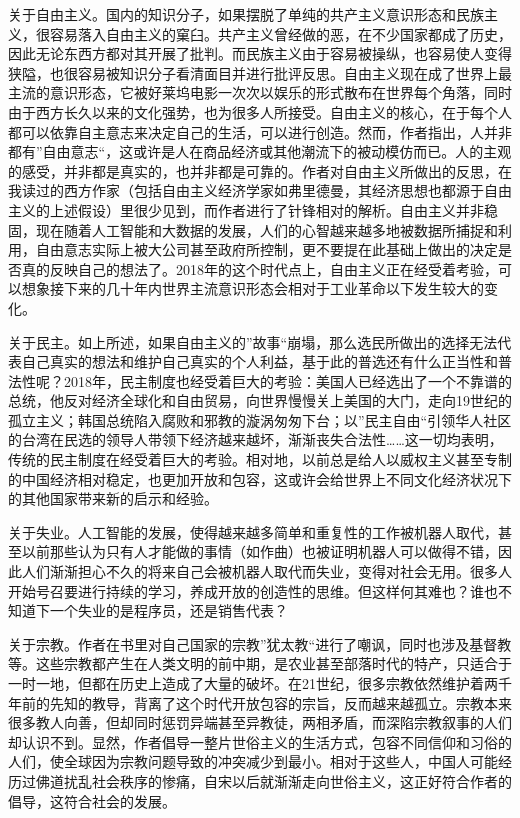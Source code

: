关于自由主义。国内的知识分子，如果摆脱了单纯的共产主义意识形态和民族主义，很容易落入自由主义的窠臼。共产主义曾经做的恶，在不少国家都成了历史，因此无论东西方都对其开展了批判。而民族主义由于容易被操纵，也容易使人变得狭隘，也很容易被知识分子看清面目并进行批评反思。自由主义现在成了世界上最主流的意识形态，它被好莱坞电影一次次以娱乐的形式散布在世界每个角落，同时由于西方长久以来的文化强势，也为很多人所接受。自由主义的核心，在于每个人都可以依靠自主意志来决定自己的生活，可以进行创造。然而，作者指出，人并非都有”自由意志“，这或许是人在商品经济或其他潮流下的被动模仿而已。人的主观的感受，并非都是真实的，也并非都是可靠的。作者对自由主义所做出的反思，在我读过的西方作家（包括自由主义经济学家如弗里德曼，其经济思想也都源于自由主义的上述假设）里很少见到，而作者进行了针锋相对的解析。自由主义并非稳固，现在随着人工智能和大数据的发展，人们的心智越来越多地被数据所捕捉和利用，自由意志实际上被大公司甚至政府所控制，更不要提在此基础上做出的决定是否真的反映自己的想法了。2018年的这个时代点上，自由主义正在经受着考验，可以想象接下来的几十年内世界主流意识形态会相对于工业革命以下发生较大的变化。

关于民主。如上所述，如果自由主义的”故事“崩塌，那么选民所做出的选择无法代表自己真实的想法和维护自己真实的个人利益，基于此的普选还有什么正当性和普法性呢？2018年，民主制度也经受着巨大的考验：美国人已经选出了一个不靠谱的总统，他反对经济全球化和自由贸易，向世界慢慢关上美国的大门，走向19世纪的孤立主义；韩国总统陷入腐败和邪教的漩涡匆匆下台；以”民主自由“引领华人社区的台湾在民选的领导人带领下经济越来越坏，渐渐丧失合法性……这一切均表明，传统的民主制度在经受着巨大的考验。相对地，以前总是给人以威权主义甚至专制的中国经济相对稳定，也更加开放和包容，这或许会给世界上不同文化经济状况下的其他国家带来新的启示和经验。

关于失业。人工智能的发展，使得越来越多简单和重复性的工作被机器人取代，甚至以前那些认为只有人才能做的事情（如作曲）也被证明机器人可以做得不错，因此人们渐渐担心不久的将来自己会被机器人取代而失业，变得对社会无用。很多人开始号召要进行持续的学习，养成开放的创造性的思维。但这样何其难也？谁也不知道下一个失业的是程序员，还是销售代表？

关于宗教。作者在书里对自己国家的宗教”犹太教“进行了嘲讽，同时也涉及基督教等。这些宗教都产生在人类文明的前中期，是农业甚至部落时代的特产，只适合于一时一地，但都在历史上造成了大量的破坏。在21世纪，很多宗教依然维护着两千年前的先知的教导，背离了这个时代开放包容的宗旨，反而越来越孤立。宗教本来很多教人向善，但却同时惩罚异端甚至异教徒，两相矛盾，而深陷宗教叙事的人们却认识不到。显然，作者倡导一整片世俗主义的生活方式，包容不同信仰和习俗的人们，使全球因为宗教问题导致的冲突减少到最小。相对于这些人，中国人可能经历过佛道扰乱社会秩序的惨痛，自宋以后就渐渐走向世俗主义，这正好符合作者的倡导，这符合社会的发展。


